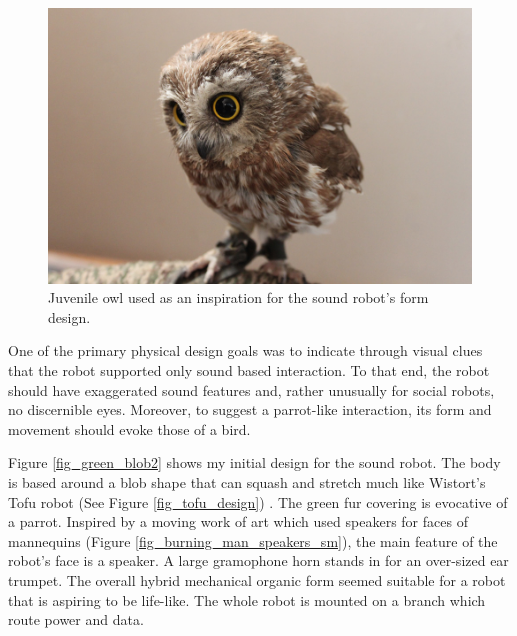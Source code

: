   \begin{figure}[thpb]
      \centering
      \includegraphics[width=4.6in]{figures/design/owl_inspiration.jpg}
      \caption{Juvenile owl used as an inspiration for the sound robot's form design.}
      \label{fig_owl_inspiration}
   \end{figure}

One of the primary physical design goals was to indicate through visual clues that the robot supported only sound based interaction. To that end, the robot should have exaggerated sound features and, rather unusually for social robots, no discernible eyes. Moreover, to suggest a parrot-like interaction, its form and movement should evoke those of a bird. 

Figure \ref{fig_green_blob2} shows my initial design for the sound robot. The body is based around a blob shape that can squash and stretch much like Wistort's Tofu robot (See Figure \ref{fig_tofu_design}) \cite{wistort_tofu_draw}. The green fur covering is evocative of a parrot. Inspired by a moving work of art which used speakers for faces of mannequins (Figure \ref{fig_burning_man_speakers_sm}), the main feature of the robot's face is a speaker. A large gramophone horn stands in for an over-sized ear trumpet. The overall hybrid mechanical organic form seemed suitable for a robot that is aspiring to be life-like. The whole robot is mounted on a branch which route power and data. 


